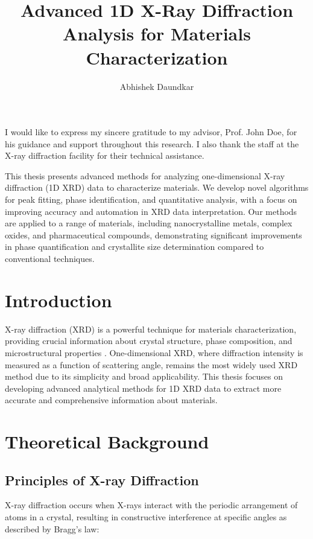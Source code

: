 \documentclass{DMSE-Thesis}
\title{Advanced 1D X-Ray Diffraction Analysis for Materials Characterization}
\author{Abhishek Daundkar}
\begin{document}
\maketitle
\copyrightpage

\frontmatter
\signaturepage
{}

\tableofcontents
\listoffigures
\listoftables

\acknowledgements
I would like to express my sincere gratitude to my advisor, Prof. John Doe, for his guidance and support throughout this research. I also thank the staff at the X-ray diffraction facility for their technical assistance.

\abstract
This thesis presents advanced methods for analyzing one-dimensional X-ray diffraction (1D XRD) data to characterize materials. We develop novel algorithms for peak fitting, phase identification, and quantitative analysis, with a focus on improving accuracy and automation in XRD data interpretation. Our methods are applied to a range of materials, including nanocrystalline metals, complex oxides, and pharmaceutical compounds, demonstrating significant improvements in phase quantification and crystallite size determination compared to conventional techniques.

\mainmatter
\chapter{Introduction}
X-ray diffraction (XRD) is a powerful technique for materials characterization, providing crucial information about crystal structure, phase composition, and microstructural properties \cite{cullity2014elements}. One-dimensional XRD, where diffraction intensity is measured as a function of scattering angle, remains the most widely used XRD method due to its simplicity and broad applicability. This thesis focuses on developing advanced analytical methods for 1D XRD data to extract more accurate and comprehensive information about materials.

\chapter{Theoretical Background}
\section{Principles of X-ray Diffraction}
X-ray diffraction occurs when X-rays interact with the periodic arrangement of atoms in a crystal, resulting in constructive interference at specific angles as described by Bragg's law:
\end{document}
